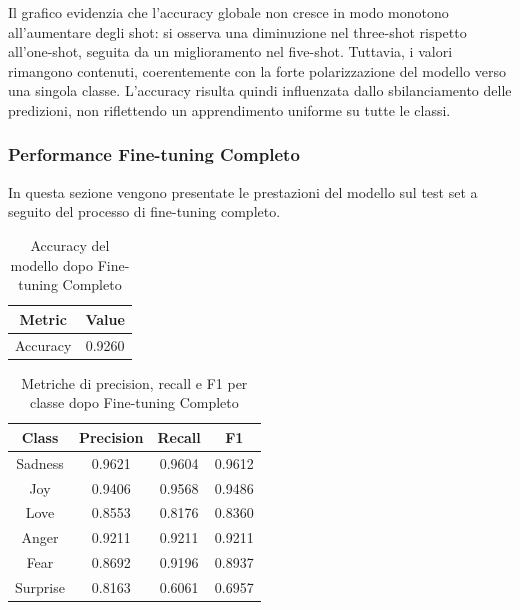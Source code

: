 \documentclass[a4paper,12pt]{article}
\begin{document}
Il grafico evidenzia che l’accuracy globale non cresce in modo monotono all’aumentare degli shot: si osserva una diminuzione nel three-shot rispetto all’one-shot, seguita da un miglioramento nel five-shot. Tuttavia, i valori rimangono contenuti, coerentemente con la forte polarizzazione del modello verso una singola classe. L’accuracy risulta quindi influenzata dallo sbilanciamento delle predizioni, non riflettendo un apprendimento uniforme su tutte le classi.

\subsubsection*{Performance Fine-tuning Completo}

In questa sezione vengono presentate le prestazioni del modello sul test set a seguito del processo di fine-tuning completo.

\begin{table}[H]
    \centering
    \begin{tabular}{cc}
        \toprule
        Metric   & Value  \\
        \midrule
        Accuracy & 0.9260 \\
        \bottomrule
    \end{tabular}
    \caption{Accuracy del modello dopo Fine-tuning Completo}
\end{table}

\vspace{0.5cm}

\begin{table}[H]
    \centering
    \begin{tabular}{cccc}
        \toprule
        Class    & Precision & Recall & F1     \\
        \midrule
        Sadness  & 0.9621    & 0.9604 & 0.9612 \\
        Joy      & 0.9406    & 0.9568 & 0.9486 \\
        Love     & 0.8553    & 0.8176 & 0.8360 \\
        Anger    & 0.9211    & 0.9211 & 0.9211 \\
        Fear     & 0.8692    & 0.9196 & 0.8937 \\
        Surprise & 0.8163    & 0.6061 & 0.6957 \\
        \bottomrule
    \end{tabular}
    \caption{Metriche di precision, recall e F1 per classe dopo Fine-tuning Completo}
\end{table}
\end{document}

